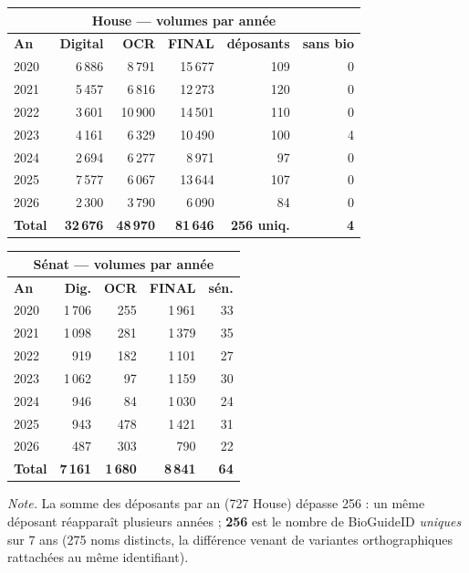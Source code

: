 \documentclass[11pt,a4paper]{article}
\begin{document}
\begin{center}\small
\begin{tabular}{@{}lrrrrr@{}}
\multicolumn{6}{c}{\textbf{House --- volumes par année}}\\
\toprule
\textbf{An} & \textbf{Digital} & \textbf{OCR} & \textbf{FINAL} & \textbf{déposants} & \textbf{sans bio}\\
\midrule
2020 & 6\,886 & 8\,791 & 15\,677 & 109 & 0 \\
2021 & 5\,457 & 6\,816 & 12\,273 & 120 & 0 \\
2022 & 3\,601 & 10\,900 & 14\,501 & 110 & 0 \\
2023 & 4\,161 & 6\,329 & 10\,490 & 100 & 4 \\
2024 & 2\,694 & 6\,277 & 8\,971 & 97 & 0 \\
2025 & 7\,577 & 6\,067 & 13\,644 & 107 & 0 \\
2026 & 2\,300 & 3\,790 & 6\,090 & 84 & 0 \\
\midrule
\textbf{Total} & \textbf{32\,676} & \textbf{48\,970} & \textbf{81\,646} & \textbf{256 uniq.} & \textbf{4}\\
\bottomrule
\end{tabular}
\hfill
\begin{tabular}{@{}lrrrr@{}}
\multicolumn{5}{c}{\textbf{Sénat --- volumes par année}}\\
\toprule
\textbf{An} & \textbf{Dig.} & \textbf{OCR} & \textbf{FINAL} & \textbf{sén.}\\
\midrule
2020 & 1\,706 & 255 & 1\,961 & 33 \\
2021 & 1\,098 & 281 & 1\,379 & 35 \\
2022 & 919 & 182 & 1\,101 & 27 \\
2023 & 1\,062 & 97 & 1\,159 & 30 \\
2024 & 946 & 84 & 1\,030 & 24 \\
2025 & 943 & 478 & 1\,421 & 31 \\
2026 & 487 & 303 & 790 & 22 \\
\midrule
\textbf{Total} & \textbf{7\,161} & \textbf{1\,680} & \textbf{8\,841} & \textbf{64}\\
\bottomrule
\end{tabular}
\end{center}

\emph{Note.} La somme des déposants par an (727 House) dépasse 256 : un même déposant réapparaît
plusieurs années ; \textbf{256} est le nombre de BioGuideID \emph{uniques} sur 7 ans (275 noms distincts,
la différence venant de variantes orthographiques rattachées au même identifiant).
\end{document}
